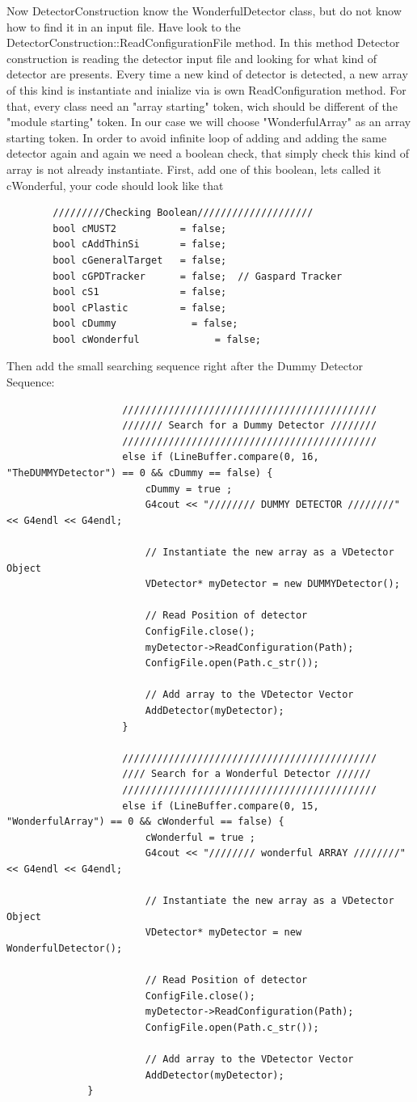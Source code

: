 \documentclass{book}
\begin{document}
		Now DetectorConstruction know the WonderfulDetector class, but do not know how to find it in an input file. Have look to the DetectorConstruction::ReadConfigurationFile method. In this method Detector construction is reading the detector input file and looking for what kind of detector are presents. Every time a new kind of detector is detected, a new array of this kind is instantiate and inialize via is own ReadConfiguration method. For that, every class need an "array starting" token, wich should be different of the "module starting" token. In our case we will choose "WonderfulArray" as an array starting token. In order to avoid infinite loop of adding and adding the same detector again and again we need a boolean check, that simply check this kind of array is not already instantiate. First, add one of this boolean, lets called it cWonderful, your code should look like that

	\begin{verbatim}
		/////////Checking Boolean////////////////////
		bool cMUST2           = false;
		bool cAddThinSi       = false;
		bool cGeneralTarget   = false;
		bool cGPDTracker      = false;	// Gaspard Tracker
		bool cS1              = false;
		bool cPlastic         = false;
		bool cDummy         	= false;
		bool cWonderful				= false;
	\end{verbatim}


	Then add the small searching sequence right after the Dummy Detector Sequence:
			
	\begin{verbatim}
					////////////////////////////////////////////
					/////// Search for a Dummy Detector ////////
					////////////////////////////////////////////
					else if (LineBuffer.compare(0, 16, "TheDUMMYDetector") == 0 && cDummy == false) {
						cDummy = true ;
						G4cout << "//////// DUMMY DETECTOR ////////" << G4endl << G4endl;

						// Instantiate the new array as a VDetector Object
						VDetector* myDetector = new DUMMYDetector();

						// Read Position of detector
						ConfigFile.close();
						myDetector->ReadConfiguration(Path);
						ConfigFile.open(Path.c_str());

						// Add array to the VDetector Vector
						AddDetector(myDetector);
					}

					////////////////////////////////////////////
					//// Search for a Wonderful Detector //////
					////////////////////////////////////////////
					else if (LineBuffer.compare(0, 15, "WonderfulArray") == 0 && cWonderful == false) {
						cWonderful = true ;
						G4cout << "//////// wonderful ARRAY ////////" << G4endl << G4endl;

						// Instantiate the new array as a VDetector Object
						VDetector* myDetector = new WonderfulDetector();

						// Read Position of detector
						ConfigFile.close();
						myDetector->ReadConfiguration(Path);
						ConfigFile.open(Path.c_str());

						// Add array to the VDetector Vector
						AddDetector(myDetector);
		      }
	\end{verbatim}
\end{document}
